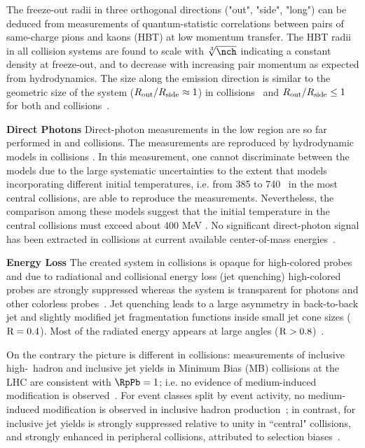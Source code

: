 \documentclass[../report.tex]{subfiles}
\begin{document}
The freeze-out radii in three orthogonal directions ("out", "side", "long") can be deduced from measurements of quantum-statistic correlations between pairs of same-charge pions and kaons (HBT) at low momentum transfer. The HBT radii in all collision systems are found to scale with $\sqrt[3]{\nch}$ indicating a constant density at freeze-out, and to decrease with increasing pair momentum \kT as expected from hydrodynamics. The size along the emission direction is similar to the geometric size of the system ($R_{\rm out}/R_{\rm side} \approx 1$) in \PbPb collisions~\cite{Adam:2015vna,Adam:2015vja,Abelev:2014pja,CMS:2014mla,Acharya:2017qtq,Acharya:2017qtq} and $R_{\rm out}/R_{\rm side} \leq 1$ for both \pPb and \pp collisions~\cite{Abelev:2014pja,Adam:2015pya,Aamodt:2011kd,CMS:2014mla,Aaboud:2017xpw}.

\textbf{Direct Photons}
Direct-photon measurements in the low \pT region are so far performed in \PbPb and \pp collisions. The measurements are reproduced by hydrodynamic models in \PbPb collisions \cite{Adam:2015lda}. In this measurement, one cannot discriminate between the models due to the large systematic uncertainties to the extent that models incorporating different initial temperatures, i.e. from 385 to 740 \UMeV\ in the most central \PbPb collisions, are able to reproduce the measurements. Nevertheless, the comparison among these models suggest that the initial temperature in the central \PbPb collisions must exceed about 400 MeV \cite{Adam:2015lda}. No significant direct-photon signal has been extracted in \pp collisions at current available center-of-mass energies~\cite{Acharya:2018dqe}.

\textbf{Energy Loss}
The created system in \PbPb collisions is opaque for high-\pT colored probes and due to radiational and collisional energy loss (jet quenching) high-\pT colored probes are strongly suppressed whereas the system is transparent for photons and other colorless probes~\cite{Aamodt:2010jd,CMS:2012aa,Abelev:2012hxa,ALICE:2012ab,Aad:2014bxa,Adam:2015ewa,Aad:2015wga}. Jet quenching leads to a large asymmetry in back-to-back jet \pT and slightly modified jet fragmentation functions inside small jet cone sizes ($\rm{R} = 0.4$). Most of the radiated energy appears at large angles ($\rm{R} > 0.8$)~\cite{Aad:2010bu,Chatrchyan:2011sx,Sirunyan:2018jju,Khachatryan:2016tfj,Sirunyan:2017bsd}. 

On the contrary the picture is different in \pPb collisions: measurements of inclusive high-\pT\ hadron and inclusive jet yields in Minimum Bias (MB) \pPb collisions at the LHC are consistent with $\RpPb = 1$; i.e. no evidence of medium-induced modification is observed~\cite{Adam:2016jfp,Sirunyan:2016fcs}.  For event classes split by event activity, no medium-induced modification is observed in inclusive hadron production~\cite{Adam:2015doa, Acharya:2017okq}; in contrast, for inclusive jet yields \RpPb is strongly suppressed relative to unity in ``central" \pPb collisions, and strongly enhanced in peripheral \pPb collisions, attributed to selection biases~\cite{Acharya:2017okq}. 
\end{document}

